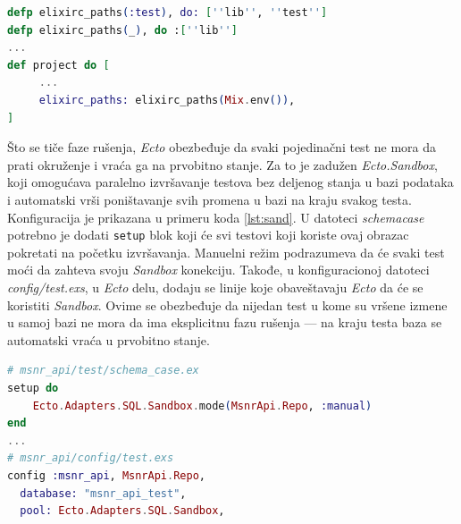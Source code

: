 \documentclass[12pt,oneside]{memoir}
\begin{document}
\begin{minipage}{\linewidth}
\begin{lstlisting}[language=elixir, basicstyle=\small, caption={Uključivanje datoteka iz test direktorijuma pri kompilaciji u testnom okruženju},captionpos=b, label={lst:mst}]
defp elixirc_paths(:test), do: [''lib'', ''test'']
defp elixirc_paths(_), do :[''lib'']
...
def project do [
     ...
     elixirc_paths: elixirc_paths(Mix.env()), 
]
\end{lstlisting}
\end{minipage}

\par Što se tiče faze rušenja, \emph{Ecto} obezbeđuje da svaki pojedinačni test ne mora da prati okruženje i vraća ga na prvobitno stanje. Za to je zadužen \emph{Ecto.Sandbox}, koji omogućava paralelno izvršavanje testova bez deljenog stanja u bazi podataka i automatski vrši poništavanje svih promena u bazi na kraju svakog testa. Konfiguracija je prikazana u primeru koda \ref{lst:sand}. U datoteci \emph{schema{\textunderscore}case} potrebno je dodati \texttt{setup} blok koji će svi testovi koji koriste ovaj obrazac pokretati na početku izvršavanja. Manuelni režim podrazumeva da će svaki test moći da zahteva svoju \emph{Sandbox} konekciju. Takođe, u konfiguracionoj datoteci \emph{config/test.exs}, u \emph{Ecto} delu, dodaju se linije koje obaveštavaju \emph{Ecto} da će se koristiti \emph{Sandbox}. Ovime se obezbeđuje da nijedan test u kome su vršene izmene u samoj bazi ne mora da ima eksplicitnu fazu rušenja --- na kraju testa baza se automatski vraća u prvobitno stanje. \\ 


\begin{minipage}{\linewidth}
\begin{lstlisting}[language=elixir, basicstyle=\small, caption={Podešavanje \emph{Ecto.Sandbox}},captionpos=b, label={lst:sand}]
# msnr_api/test/schema_case.ex
setup do
    Ecto.Adapters.SQL.Sandbox.mode(MsnrApi.Repo, :manual)
end
...
# msnr_api/config/test.exs
config :msnr_api, MsnrApi.Repo,
  database: "msnr_api_test",
  pool: Ecto.Adapters.SQL.Sandbox,
\end{lstlisting}
\end{minipage}
\end{document}
